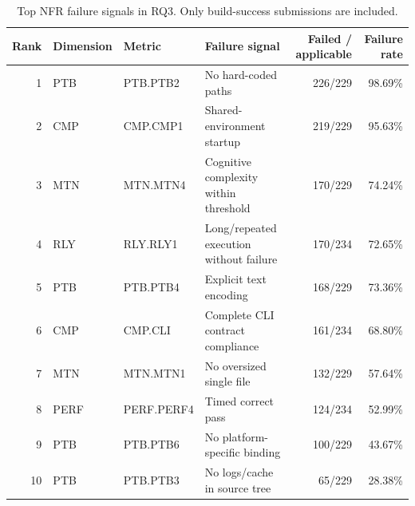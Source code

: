 \begin{table}[t]
\centering
\small
\caption{Top NFR failure signals in RQ3. Only build-success submissions are included.}
\label{tab:rq3-top-nfr-failures}
\begin{tabular}{rlllrr}
\toprule
Rank & Dimension & Metric & Failure signal & Failed / applicable & Failure rate \\
\midrule
1 & PTB & PTB.PTB2 & No hard-coded paths & 226/229 & 98.69\% \\
2 & CMP & CMP.CMP1 & Shared-environment startup & 219/229 & 95.63\% \\
3 & MTN & MTN.MTN4 & Cognitive complexity within threshold & 170/229 & 74.24\% \\
4 & RLY & RLY.RLY1 & Long/repeated execution without failure & 170/234 & 72.65\% \\
5 & PTB & PTB.PTB4 & Explicit text encoding & 168/229 & 73.36\% \\
6 & CMP & CMP.CLI & Complete CLI contract compliance & 161/234 & 68.80\% \\
7 & MTN & MTN.MTN1 & No oversized single file & 132/229 & 57.64\% \\
8 & PERF & PERF.PERF4 & Timed correct pass & 124/234 & 52.99\% \\
9 & PTB & PTB.PTB6 & No platform-specific binding & 100/229 & 43.67\% \\
10 & PTB & PTB.PTB3 & No logs/cache in source tree & 65/229 & 28.38\% \\
\bottomrule
\end{tabular}
\end{table}
